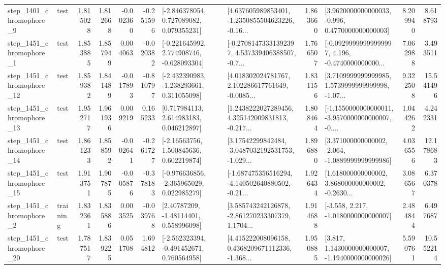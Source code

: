 \begin{tabular}{llrrrrllrlrr}
  step\_1401\_chromophore\_9 &      test &      1.815028 &    1.812668 &     -0.002360 & -0.251596 &    [-2.846378054, 0.727089082, 0.079355231] &  [4.637605989853401, -1.2350855504623226, -0.16... &       1.863660 &   [3.9620000000000033, -0.996, 0.4770000000000003] &            8.209940 &          8.618793 \\
  step\_1451\_chromophore\_1 &      test &      1.853885 &    1.857949 &      0.004063 & -0.020382 &   [-0.221645992, 2.774908746, -0.628093304] &  [-0.27081473331392397, 4.537339406388507, -0.7... &       1.766507 &  [-0.09299999999999997, 4.196, -0.4740000000000... &            7.062988 &          3.493511 \\
 step\_1451\_chromophore\_12 &      test &      1.859382 &    1.841489 &     -0.017893 & -0.810797 &   [-2.432390983, -1.238293661, 0.311055098] &  [4.018302024781767, 2.102286617761649, -0.0085... &       1.831156 &  [3.7109999999999985, 1.5739999999999998, -1.07... &            9.322508 &         15.541496 \\
 step\_1451\_chromophore\_13 &      test &      1.952717 &    1.961936 &      0.009219 &  0.165233 &     [0.717984113, 2.614983183, 0.046212897] &  [1.2438222027289456, 4.325142009831813, -0.217... &       1.808464 &  [-1.1550000000000011, -3.9570000000000007, -0.... &            1.044262 &          4.242331 \\
 step\_1451\_chromophore\_14 &      test &      1.861233 &    1.858592 &     -0.002641 & -0.261727 &     [-2.16563756, 1.500845636, 0.602219874] &  [3.17542299842484, -3.0487032192531753, -1.029... &       1.896880 &   [3.371000000000002, -2.064, -1.0889999999999986] &            4.036556 &         12.178683 \\
 step\_1451\_chromophore\_15 &      test &      1.913751 &    1.907875 &     -0.005876 & -0.378183 &   [-0.976636856, -2.365965029, 0.022985279] &  [-1.687475356516294, -4.140502640880502, -0.21... &       1.926434 &  [1.618000000000002, 3.868000000000002, -0.2630... &            3.086567 &          6.370378 \\
  step\_1451\_chromophore\_2 &  training &      1.832361 &    1.835886 &      0.003525 & -0.039768 &      [2.40787209, -1.48114401, 0.558996098] &  [3.585743242126878, -2.861270233307379, 1.1704... &       1.914688 &               [-3.558, 2.217, -1.0180000000000007] &            2.484844 &          6.497687 \\
 step\_1451\_chromophore\_20 &      test &      1.787517 &    1.839225 &      0.051708 &  1.694812 &   [-2.562323394, -0.491452671, 0.760564958] &  [4.415222008096158, 0.4368209671112336, -1.368... &       1.950885 &   [3.817, 1.1430000000000007, -1.1940000000000026] &            5.590761 &         10.552214 \\

\end{tabular}
